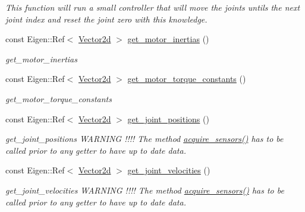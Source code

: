 \begin{DoxyCompactItemize}
\begin{DoxyCompactList}\small\item\em This function will run a small controller that will move the joints untils the next joint index and reset the joint zero with this knowledge. \end{DoxyCompactList}\item 
const Eigen\+::\+Ref$<$ \hyperlink{common__header_8hpp_acb6916bc8c9fe9d98c484fd4cc201447}{Vector2d} $>$ \hyperlink{classblmc__robots_1_1Teststand_a4897109730380ae0be7da37e2bd69e81}{get\+\_\+motor\+\_\+inertias} ()
\begin{DoxyCompactList}\small\item\em get\+\_\+motor\+\_\+inertias \end{DoxyCompactList}\item 
const Eigen\+::\+Ref$<$ \hyperlink{common__header_8hpp_acb6916bc8c9fe9d98c484fd4cc201447}{Vector2d} $>$ \hyperlink{classblmc__robots_1_1Teststand_a483bc937ac8c95b93bb90c47744da2e8}{get\+\_\+motor\+\_\+torque\+\_\+constants} ()
\begin{DoxyCompactList}\small\item\em get\+\_\+motor\+\_\+torque\+\_\+constants \end{DoxyCompactList}\item 
const Eigen\+::\+Ref$<$ \hyperlink{common__header_8hpp_acb6916bc8c9fe9d98c484fd4cc201447}{Vector2d} $>$ \hyperlink{classblmc__robots_1_1Teststand_adf08db3dbb4fd8da74c8ef15fb393c1a}{get\+\_\+joint\+\_\+positions} ()
\begin{DoxyCompactList}\small\item\em get\+\_\+joint\+\_\+positions W\+A\+R\+N\+I\+NG !!!! The method \hyperlink{classblmc__robots_1_1Teststand_a4203e25148ab5b4ddfef3b46647213c6}{acquire\+\_\+sensors()} has to be called prior to any getter to have up to date data. \end{DoxyCompactList}\item 
const Eigen\+::\+Ref$<$ \hyperlink{common__header_8hpp_acb6916bc8c9fe9d98c484fd4cc201447}{Vector2d} $>$ \hyperlink{classblmc__robots_1_1Teststand_acd1b325c6039fffbd40198f6deb9542c}{get\+\_\+joint\+\_\+velocities} ()
\begin{DoxyCompactList}\small\item\em get\+\_\+joint\+\_\+velocities W\+A\+R\+N\+I\+NG !!!! The method \hyperlink{classblmc__robots_1_1Teststand_a4203e25148ab5b4ddfef3b46647213c6}{acquire\+\_\+sensors()} has to be called prior to any getter to have up to date data. \end{DoxyCompactList}\item 

\end{DoxyCompactItemize}
